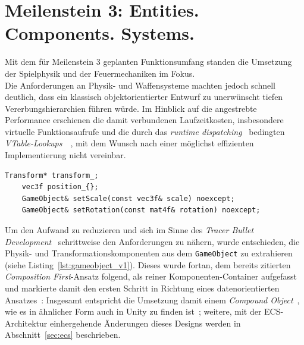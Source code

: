 \section{Meilenstein 3: Entities. Components. Systems.}\label{sec:meilenstein_3}

Mit dem für Meilenstein 3 geplanten Funktionsumfang standen die Umsetzung der Spielphysik und der Feuermechaniken im Fokus.\\

Die Anforderungen an Physik- und Waffensysteme machten jedoch schnell deutlich, dass ein klassisch objektorientierter Entwurf zu unerwünscht tiefen Vererbungshierarchien führen würde.
Im Hinblick auf die angestrebte Performance erschienen die damit verbundenen Laufzeitkosten, insbesondere virtuelle Funktionsaufrufe und die durch das \textit{runtime dispatching}~\cite{MS94} bedingten \textit{VTable-Lookups}~\cite[S. 161-164]{Gre19}~\cite[S. 55]{agnerfog}, mit dem Wunsch nach einer möglichst effizienten Implementierung nicht vereinbar.\\

\vspace{5mm}
\begin{lstlisting}[style=c++style,
    caption={
        Auszug aus dem Interface des \texttt{GameObject} (Stand Meilenstein 2). Die gleichzeitige Verwendung einer spielweltbasierten \texttt{position} und der \texttt{translation} aus dem Szenegraph weist bereits auf eine doppelte Zustandsrepräsentation hin. Die inkonsequente Trennung sorgte in späteren Meilensteinen für Synchronisations- und Zuständigkeitskonflikte beim Hinzufügen weiterer transformationsbasierter Systeme.
    },
    label=lst:gameobject_v1]
    Transform* transform_;
    vec3f position_{};
    GameObject& setScale(const vec3f& scale) noexcept;
    GameObject& setRotation(const mat4f& rotation) noexcept;
\end{lstlisting}
\vspace{5mm}

Um den Aufwand zu reduzieren und sich im Sinne des \textit{Tracer Bullet Development}~\cite[S. 50-55]{TH20} schrittweise den Anforderungen zu nähern, wurde entschieden, die Physik- und Transformationskomponenten aus dem \texttt{GameObject} zu extrahieren (siehe Listing~\ref{lst:gameobject_v1}).
Dieses wurde fortan, dem bereits zitierten \textit{Composition First}-Ansatz folgend, als reiner Komponenten-Container aufgefasst und markierte damit den ersten Schritt in Richtung eines datenorientierten Ansatzes~\cite{Bay22}: Insgesamt entspricht die Umsetzung damit einem \textit{Compound Object}~\cite[S. 88]{Fab18}, wie es in ähnlicher Form auch in Unity zu finden ist~\cite{UnityGameObject}; weitere, mit der ECS-Architektur einhergehende Änderungen dieses Designs werden in Abschnitt~\ref{sec:ecs} beschrieben.

